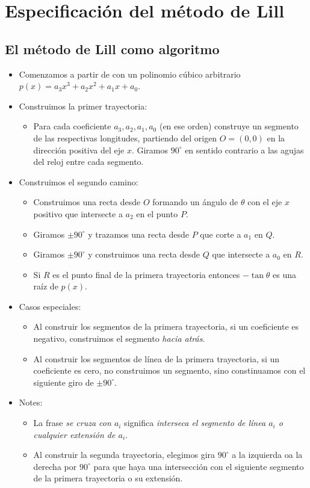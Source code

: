 \section{Especificación del método de Lill}\label{s.method}

\subsection{El método de Lill como algoritmo}
\begin{itemize}
\item Comenzamos a partir de con un polinomio cúbico arbitrario $p(x)=a_3x^3+a_2x^2+a_1x+a_0$.
\item Construimos la primer trayectoria:
\begin{itemize}
\item Para cada coeficiente $a_3,a_2,a_1,a_0$ (en ese orden) construye un segmento de las respectivas longitudes, partiendo del origen $O=(0,0)$ en la dirección positiva del eje $x$. Giramos $90^\circ$ en sentido contrario a las agujas del reloj entre cada segmento.
\end{itemize}
\item Construimos el segundo camino:
\begin{itemize}
\item Construimos una recta desde $O$ formando un ángulo de $\theta$ con el eje $x$ positivo que intersecte a $a_2$ en el punto $P$.
\item Giramos $\pm 90^\circ$ y trazamos una recta desde $P$ que corte a $a_1$ en $Q$.
\item Giramos $\pm 90^\circ$ y construimos una recta desde $Q$ que intersecte a $a_0$ en $R$.
\item Si $R$ es el punto final de la primera trayectoria entonces $-\tan\theta$ es una raíz de $p(x)$.
\end{itemize}
\item Casos especiales:
\begin{itemize}
\item Al construir los segmentos de la primera trayectoria, si un coeficiente es negativo, construimos el segmento  \emph{hacia atrás}.
\item Al construir los segmentos de línea de la primera trayectoria, si un coeficiente es cero, no construimos un segmento, sino constinuamos con el siguiente giro de $\pm 90^\circ$.
\end{itemize}
\item Notes:
\begin{itemize}
\item La frase \emph{se cruza con $a_i$} significa \emph{interseca el segmento de línea $a_i$ o cualquier extensión de $a_i$}.
\item Al construir la segunda trayectoria, elegimos gira $90^\circ$ a la izquierda oa la derecha por $90^\circ$ para que haya una intersección con el siguiente segmento de la primera trayectoria o su extensión.
\end{itemize}
\end{itemize}


